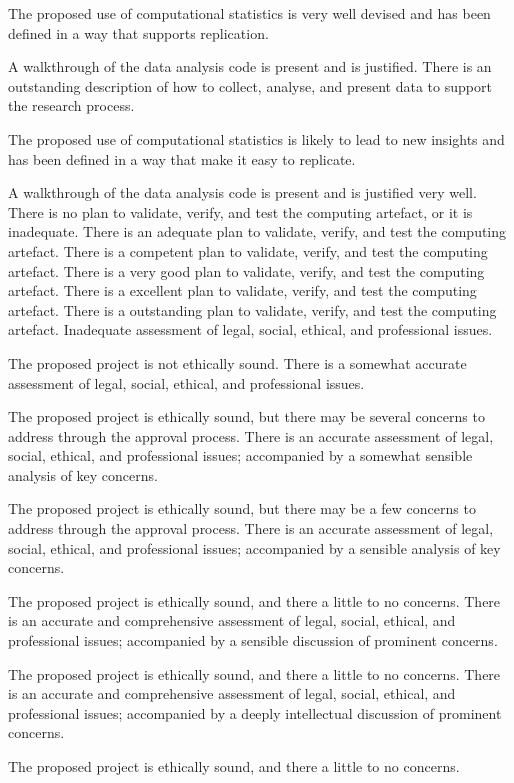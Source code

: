 \begin{markingrubric}
         \par		The proposed use of computational statistics is very well devised and has been defined in a way that supports replication.      
        \par		A walkthrough of the data analysis code is present and is justified.   
        \grade 		There is an outstanding description of how to collect, analyse, and present data to support the research process.
         \par		The proposed use of computational statistics is likely to lead to new insights and has been defined in a way that make it easy to replicate.        
        \par		A walkthrough of the data analysis code is present and is justified very well. 
        \grade\fail 	There is no plan to validate, verify, and test the computing artefact, or it is inadequate.
        \grade 		There is an adequate plan to validate, verify, and test the computing artefact.
        \grade 		There is a competent plan to validate, verify, and test the computing artefact.
        \grade 		There is a very good plan to validate, verify, and test the computing artefact.
        \grade 		There is a excellent plan to validate, verify, and test the computing artefact.
        \grade 		There is a outstanding plan to validate, verify, and test the computing artefact.    
        \grade\fail 	Inadequate assessment of legal, social, ethical, and professional issues.
         \par		The proposed project is not ethically sound.
        \grade 		There is a somewhat accurate assessment of legal, social, ethical, and professional issues.
        \par		The proposed project is ethically sound, but there may be several concerns to address through the approval process.
        \grade 		There is an accurate assessment of legal, social, ethical, and professional issues; accompanied by a somewhat sensible analysis of key concerns.
        \par		The proposed project is ethically sound, but there may be a few concerns to address through the approval process.
        \grade 		There is an accurate assessment of legal, social, ethical, and professional issues; accompanied by a sensible analysis of key concerns.
        \par		The proposed project is ethically sound, and there a little to no concerns.
        \grade 		There is an accurate and comprehensive assessment of legal, social, ethical, and professional issues; accompanied by a sensible discussion of prominent concerns.
        \par		The proposed project is ethically sound, and there a little to no concerns.
        \grade 		There is an accurate and comprehensive assessment of legal, social, ethical, and professional issues; accompanied by a deeply intellectual discussion of prominent concerns.
        \par		The proposed project is ethically sound, and there a little to no concerns.
%
\end{markingrubric}

